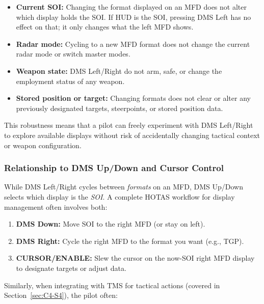 \documentclass[11pt,a4paper]{article}
\begin{document}
\begin{itemize}

\item \textbf{Current SOI:} Changing the format displayed on an MFD does not alter which display holds the SOI. If HUD is the SOI, pressing DMS Left has no effect on that; it only changes what the left MFD shows.

\item \textbf{Radar mode:} Cycling to a new MFD format does not change the current radar mode or switch master modes.

\item \textbf{Weapon state:} DMS Left/Right do not arm, safe, or change the employment status of any weapon.

\item \textbf{Stored position or target:} Changing formats does not clear or alter any previously designated targets, steerpoints, or stored position data.

\end{itemize}

This robustness means that a pilot can freely experiment with DMS Left/Right to explore available displays without risk of accidentally changing tactical context or weapon configuration.

\subsubsection{Relationship to DMS Up/Down and Cursor Control}
\label{sec:C4-S3-S4}

While DMS Left/Right cycles between \textit{formats} on an MFD, DMS Up/Down selects which display is the \textit{SOI}. A complete HOTAS workflow for display management often involves both:

\begin{enumerate}

\item \textbf{DMS Down:} Move SOI to the right MFD (or stay on left).

\item \textbf{DMS Right:} Cycle the right MFD to the format you want (e.g., TGP).

\item \textbf{CURSOR/ENABLE:} Slew the cursor on the now-SOI right MFD display to designate targets or adjust data.

\end{enumerate}

Similarly, when integrating with TMS for tactical actions (covered in Section~\ref{sec:C4-S4}), the pilot often:
\end{document}
